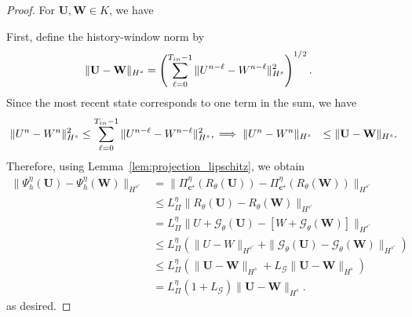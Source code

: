 \documentclass[10pt,a4paper]{amsart}
\begin{document}
\begin{proof}
For \(\mathbf U,\mathbf W\in K\), we have


First, define the history-window norm by
\[
\begin{aligned}
    \|\mathbf U-\mathbf W\|_{H^s}
    &=
    \left(
    \sum_{\ell=0}^{T_{\rm in}-1}
    \|U^{n-\ell}-W^{n-\ell}\|_{H^s}^2
    \right)^{1/2}.
\end{aligned}
\]
Since the most recent state corresponds to one term in the sum, we have
\[
\begin{aligned}
    \|U^n-W^n\|_{H^s}^2
    &\le
    \sum_{\ell=0}^{T_{\rm in}-1}
    \|U^{n-\ell}-W^{n-\ell}\|_{H^s}^2, \implies \|U^n-W^n\|_{H^s}
    &\le
    \|\mathbf U-\mathbf W\|_{H^s}.
\end{aligned}
\]
Therefore, using Lemma~\ref{lem:projection_lipschitz}, we obtain
\[
\begin{aligned}
    \|\Psi_h^\eta(\mathbf U)-\Psi_h^\eta(\mathbf W)\|_{H^{s'}}
    &=
    \|\Pi_{\mathbf c^\star}^{\eta}(R_\theta(\mathbf U))
    -
    \Pi_{\mathbf c^\star}^{\eta}(R_\theta(\mathbf W))\|_{H^{s'}} \\
    &\le
    L_\Pi^\eta
    \|R_\theta(\mathbf U)-R_\theta(\mathbf W)\|_{H^{s'}} \\
    &=
    L_\Pi^\eta
    \|U+\mathcal G_\theta(\mathbf U)
    -
    [W+\mathcal G_\theta(\mathbf W)]\|_{H^{s'}} \\
    &\le
    L_\Pi^\eta
    \left(
    \|U-W\|_{H^{s'}}
    +
    \|\mathcal G_\theta(\mathbf U)-\mathcal G_\theta(\mathbf W)\|_{H^{s'}}
    \right) \\
    &\le
    L_\Pi^\eta
    \left(
    \|\mathbf U-\mathbf W\|_{H^s}
    +
    L_{\mathcal G}\|\mathbf U-\mathbf W\|_{H^s}
    \right) \\
    &=
    L_\Pi^\eta(1+L_{\mathcal G})
    \|\mathbf U-\mathbf W\|_{H^s}.
\end{aligned}
\]
as desired. 
\end{proof}
\end{document}
